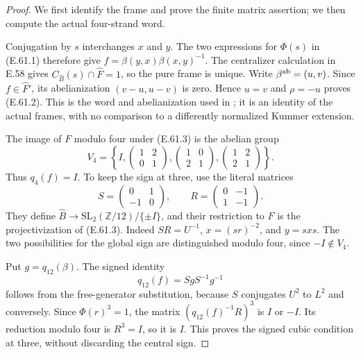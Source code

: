 \begin{proof}
We first identify the frame and prove the finite matrix assertion;
we then compute the actual four-strand word.

Conjugation by $s$ interchanges $x$ and $y$.  The two expressions
for $\Phi(s)$ in (E.61.1) therefore give
$f=\beta(y,x)\beta(x,y)^{-1}$.
The centralizer calculation in E.58 gives
$C_{\widehat B}(s)\cap\widehat F=1$, so the pure frame is unique.
Write $\beta^{\rm ab}=(u,v)$.  Since $f\in\widehat F'$,
its abelianization $(v-u,u-v)$ is zero.  Hence $u=v$ and
$\rho=-u$ proves (E.61.2).  This is the word and abelianization
used in \cite[Definition 5.1]{BCNakamuraSchneps2000}; it is an
identity of the actual frames, with no comparison to a differently
normalized Kummer extension.

The image of $F$ modulo four under (E.61.3) is the abelian group
\[
 V_4=\left\{
 I,\begin{pmatrix}1&2\\0&1\end{pmatrix},
 \begin{pmatrix}1&0\\2&1\end{pmatrix},
 \begin{pmatrix}1&2\\2&1\end{pmatrix}\right\}.
 \tag{E.61.9}
\]
Thus $q_4(f)=I$.  To keep the sign at three, use the literal
matrices
\[
 S=\begin{pmatrix}0&1\\-1&0\end{pmatrix},\qquad
 R=\begin{pmatrix}0&-1\\1&-1\end{pmatrix}.
 \tag{E.61.10}
\]
They define $\widehat B\to\mathrm{SL}_2(\mathbb Z/12)/\{\pm I\}$,
and their restriction to $F$ is the projectivization of (E.61.3).
Indeed $SR=U^{-1}$, $x=(sr)^{-2}$, and $y=sxs$.
The two possibilities for the global sign are distinguished modulo
four, since $-I\notin V_4$.

Put $g=q_{12}(\beta)$.  The signed identity
\[
             q_{12}(f)=SgS^{-1}g^{-1}
 \tag{E.61.11}
\]
follows from the free-generator substitution, because $S$ conjugates
$U^2$ to $L^2$ and conversely.  Since $\Phi(r)^3=1$, the matrix
$(q_{12}(f)^{-1}R)^3$ is $I$ or $-I$.  Its reduction modulo four
is $R^3=I$, so it is $I$.  This proves the signed cubic condition
at three, without discarding the central sign.


\end{proof}
